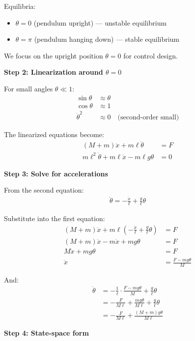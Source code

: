 \documentclass[11pt,a4paper]{article}
\begin{document}
Equilibria:
\begin{itemize}
\item $\theta = 0$ (pendulum upright) — unstable equilibrium
\item $\theta = \pi$ (pendulum hanging down) — stable equilibrium
\end{itemize}

We focus on the upright position $\theta = 0$ for control design.

\textbf{Step 2: Linearization around $\theta = 0$}

For small angles $\theta \ll 1$:
\begin{align}
\sin\theta &\approx \theta \\
\cos\theta &\approx 1 \\
\dot{\theta}^2 &\approx 0 \quad \text{(second-order small)}
\end{align}

The linearized equations become:
\begin{align}
(M + m)\ddot{x} + m\ell\ddot{\theta} &= F \\
m\ell^2\ddot{\theta} + m\ell\ddot{x} - m\ell g\theta &= 0
\end{align}

\textbf{Step 3: Solve for accelerations}

From the second equation:
\begin{align}
\ddot{\theta} = -\frac{\ddot{x}}{\ell} + \frac{g}{\ell}\theta
\end{align}

Substitute into the first equation:
\begin{align}
(M + m)\ddot{x} + m\ell\left(-\frac{\ddot{x}}{\ell} + \frac{g}{\ell}\theta\right) &= F \\
(M + m)\ddot{x} - m\ddot{x} + mg\theta &= F \\
M\ddot{x} + mg\theta &= F \\
\ddot{x} &= \frac{F - mg\theta}{M}
\end{align}

And:
\begin{align}
\ddot{\theta} &= -\frac{1}{\ell}\cdot\frac{F - mg\theta}{M} + \frac{g}{\ell}\theta \\
&= -\frac{F}{M\ell} + \frac{mg\theta}{M\ell} + \frac{g}{\ell}\theta \\
&= -\frac{F}{M\ell} + \frac{(M+m)g\theta}{M\ell}
\end{align}

\textbf{Step 4: State-space form}
\end{document}
